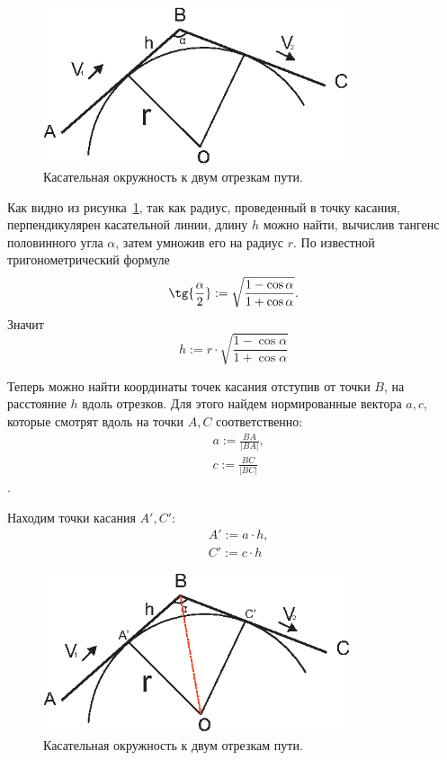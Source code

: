 \documentclass[a4paper,12pt]{article}
\begin{document}
\begin{figure}[ht!]
\centering
\includegraphics[width=90mm]{3pointCircle.eps}
\caption{Касательная окружность к двум отрезкам пути.}\label{two_lines_and_circle}
\end{figure}
Как видно из рисунка~\ref{two_lines_and_circle}, так как радиус, проведенный в точку касания, перпендикулярен касательной линии, длину $h$ можно найти, вычислив тангенс половинного угла $\alpha$, затем умножив его на радиус $r$. По известной тригонометрический формуле 
$$
  \tg{\frac{\alpha}{2}} := \sqrt{\frac{1-\cos{\alpha}}{1+\cos{\alpha}}}.
$$
Значит 
$$h := r \cdot \sqrt{\frac{1-\cos{\alpha}}{1+\cos{\alpha}}}$$

Теперь можно найти координаты точек касания отступив от точки $B$, на расстояние $h$ вдоль отрезков. Для этого найдем нормированные вектора $a,c$, которые смотрят вдоль  на точки $A,  C $ соответственно: 
\begin{align*}
    &a:=\frac{BA}{|BA|},\\
    &c:=\frac{BC}{|BC|}
\end{align*}
.

Находим точки касания $A',C'$:
\begin{align*}
    &A' := a \cdot h, \\
    &C' := c \cdot h
\end{align*}
\newpage

\begin{figure}[ht!]
\centering
\includegraphics[width=90mm]{tochki_kasania.eps}
\caption{Касательная окружность к двум отрезкам пути.}\label{two_lines_and_circle_2}
\end{figure}
\end{document}
